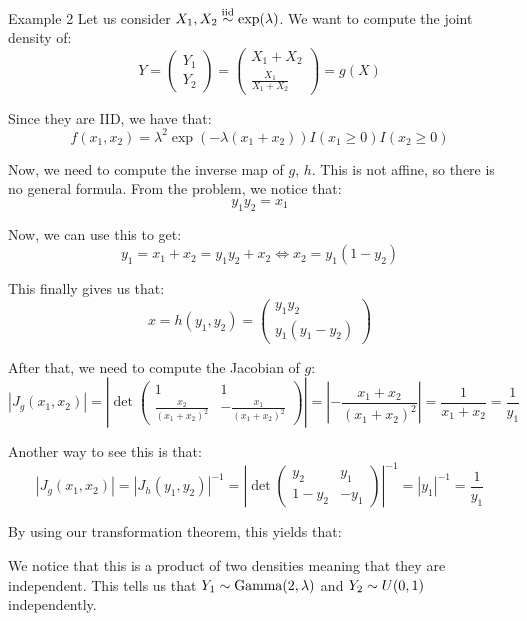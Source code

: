 \documentclass[a4paper]{article}
\begin{document}
\begin{parag}{Example 2}
    Let us consider $X_1, X_2 \iid \exp\left(\lambda\right)$. We want to compute the joint density of: 
    \[Y = \begin{pmatrix} Y_1 \\ Y_2 \end{pmatrix} = \begin{pmatrix} X_1 + X_2 \\ \frac{X_1}{X_1 + X_2} \end{pmatrix} = g\left(X\right)\]
    
    Since they are IID, we have that: 
    \[f\left(x_1, x_2\right) = \lambda^2 \exp\left(-\lambda\left(x_1 + x_2\right)\right)I\left(x_1 \geq 0\right)I\left(x_2 \geq 0\right)\]
    
    Now, we need to compute the inverse map of $g$, $h$. This is not affine, so there is no general formula. From the problem, we notice that: 
    \[y_1 y_2 = x_1\]
    
    Now, we can use this to get: 
    \[y_1 = x_1 + x_2 = y_1 y_2 + x_2 \iff x_2 = y_1\left(1 - y_2\right)\]
    
    This finally gives us that: 
    \[x = h\left(y_1, y_2\right) = \begin{pmatrix} y_1y_2 \\ y_1\left(y_1 - y_2\right) \end{pmatrix} \]

    After that, we need to compute the Jacobian of $g$:
    \[\left|J_g\left(x_1, x_2\right)\right| = \left|\det \begin{pmatrix} 1 & 1 \\ \frac{x_2}{\left(x_1 + x_2\right)^2} & -\frac{x_1}{\left(x_1 + x_2\right)^2} \end{pmatrix}\right| = \left|-\frac{x_1 + x_2}{\left(x_1 + x_2\right)^2}\right| = \frac{1}{x_1 + x_2} = \frac{1}{y_1}\] 
    
    Another way to see this is that: 
    \[\left|J_g\left(x_1, x_2\right)\right| = \left|J_h\left(y_1, y_2\right)\right|^{-1} = \left|\det\begin{pmatrix} y_2 & y_1 \\ 1 - y_2 & -y_1 \end{pmatrix} \right|^{-1} = \left|y_1\right|^{-1} = \frac{1}{y_1}\]
    
    By using our transformation theorem, this yields that: 
    
    We notice that this is a product of two densities meaning that they are independent. This tells us that $Y_1 \followsdistr \text{Gamma}\left(2, \lambda\right)$ and $Y_2 \followsdistr U\left(0, 1\right)$ independently.
\end{parag}
\end{document}
